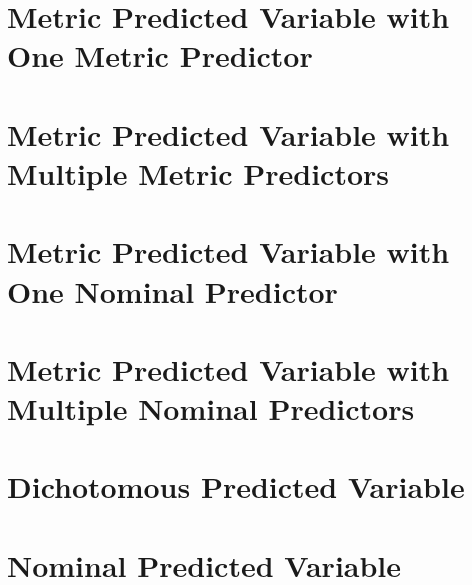 \documentclass[
  letterpaper,
  DIV=11,
  numbers=noendperiod]{scrreprt}
\begin{document}
\hypertarget{metric-predicted-variable-with-one-metric-predictor}{%
\chapter{Metric Predicted Variable with One Metric
Predictor}\label{metric-predicted-variable-with-one-metric-predictor}}


\hypertarget{metric-predicted-variable-with-multiple-metric-predictors}{%
\chapter{Metric Predicted Variable with Multiple Metric
Predictors}\label{metric-predicted-variable-with-multiple-metric-predictors}}


\hypertarget{metric-predicted-variable-with-one-nominal-predictor}{%
\chapter{Metric Predicted Variable with One Nominal
Predictor}\label{metric-predicted-variable-with-one-nominal-predictor}}


\hypertarget{metric-predicted-variable-with-multiple-nominal-predictors}{%
\chapter{Metric Predicted Variable with Multiple Nominal
Predictors}\label{metric-predicted-variable-with-multiple-nominal-predictors}}


\hypertarget{dichotomous-predicted-variable}{%
\chapter{Dichotomous Predicted
Variable}\label{dichotomous-predicted-variable}}


\hypertarget{nominal-predicted-variable}{%
\chapter{Nominal Predicted Variable}\label{nominal-predicted-variable}}

\end{document}
